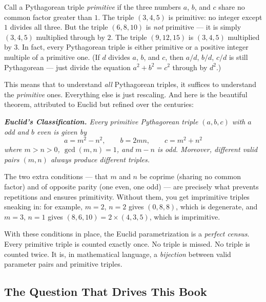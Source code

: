 \documentclass[11pt,openright,twoside]{book}
\renewenvironment{quotation}{%
  \par\vspace{8pt}%
  \begin{list}{}{%
    \setlength{\leftmargin}{2em}%
    \setlength{\rightmargin}{2em}%
  }\item[]\itshape\color{pullquote}%
}{%
  \end{list}%
  \par\vspace{8pt}%
}
\theoremstyle{definition}
\begin{document}
Call a Pythagorean triple \textit{primitive} if the three numbers $a$, $b$, and $c$ share no common factor greater than $1$. The triple $(3, 4, 5)$ is primitive: no integer except $1$ divides all three. But the triple $(6, 8, 10)$ is \textit{not} primitive --- it is simply $(3, 4, 5)$ multiplied through by $2$. The triple $(9, 12, 15)$ is $(3, 4, 5)$ multiplied by $3$. In fact, every Pythagorean triple is either primitive or a positive integer multiple of a primitive one. (If $d$ divides $a$, $b$, and $c$, then $a/d$, $b/d$, $c/d$ is still Pythagorean --- just divide the equation $a^2 + b^2 = c^2$ through by $d^2$.)

This means that to understand \textit{all} Pythagorean triples, it suffices to understand the \textit{primitive} ones. Everything else is just rescaling. And here is the beautiful theorem, attributed to Euclid but refined over the centuries:

\begin{quotation}
\noindent\itshape \textbf{Euclid's Classification.} Every primitive Pythagorean triple $(a, b, c)$ with $a$ odd and $b$ even is given by $$a = m^2 - n^2, \qquad b = 2mn, \qquad c = m^2 + n^2$$ where $m > n > 0$, $\gcd(m, n) = 1$, and $m - n$ is odd. Moreover, different valid pairs $(m, n)$ always produce different triples.
\end{quotation}

The two extra conditions --- that $m$ and $n$ be coprime (sharing no common factor) and of opposite parity (one even, one odd) --- are precisely what prevents repetitions and ensures primitivity. Without them, you get imprimitive triples sneaking in: for example, $m = 2$, $n = 2$ gives $(0, 8, 8)$, which is degenerate, and $m = 3$, $n = 1$ gives $(8, 6, 10) = 2 \times (4, 3, 5)$, which is imprimitive.

With these conditions in place, the Euclid parametrization is a \textit{perfect census}. Every primitive triple is counted exactly once. No triple is missed. No triple is counted twice. It is, in mathematical language, a \textit{bijection} between valid parameter pairs and primitive triples.


\bigskip


\subsection{The Question That Drives This Book}
\end{document}
